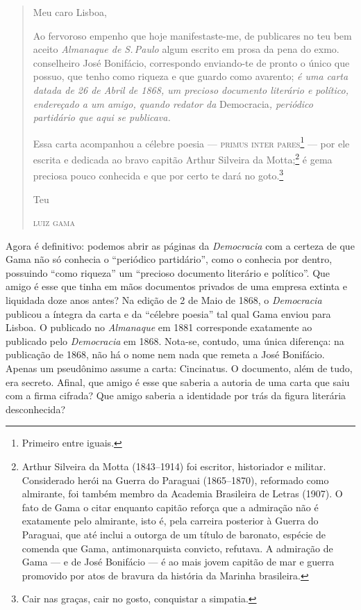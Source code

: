 \begin{quote}
Meu caro Lisboa,

Ao fervoroso empenho que hoje manifestaste-me, de publicares no teu bem
aceito \emph{Almanaque de S.\,Paulo} algum escrito em prosa da pena do
exmo. conselheiro José Bonifácio, correspondo enviando-te de pronto o
único que possuo, que tenho como riqueza e que guardo como avarento;
\textit{é uma carta datada de 26 de Abril de 1868, um precioso documento
literário e político, endereçado a um amigo, quando redator da}
Democracia\textit{, periódico partidário que aqui se publicava.}

Essa carta acompanhou a célebre poesia --- \textsc{primus inter pares}\footnote{Primeiro entre iguais.} --- por ele escrita e dedicada ao bravo capitão
Arthur Silveira da Motta;\footnote{Arthur Silveira da Motta (1843--1914)
  foi escritor, historiador e militar. Considerado herói na Guerra do
  Paraguai (1865--1870), reformado como almirante, foi também membro da
  Academia Brasileira de Letras (1907). O fato de Gama o citar enquanto
  capitão reforça que a admiração não é exatamente pelo almirante, isto
  é, pela carreira posterior à Guerra do Paraguai, que até inclui a
  outorga de um título de baronato, espécie de comenda que Gama,
  antimonarquista convicto, refutava. A admiração de Gama --- e de José
  Bonifácio --- é ao mais jovem capitão de mar e guerra promovido por
  atos de bravura da história da Marinha brasileira.} é gema preciosa
pouco conhecida e que por certo te dará no goto.\footnote{Cair nas
  graças, cair no gosto, conquistar a simpatia.}

\begin{flushright}
Teu

\textsc{luiz gama}
\end{flushright}
\end{quote}

Agora é definitivo: podemos abrir as páginas da \emph{Democracia} com a
certeza de que Gama não só conhecia o ``periódico partidário'', como o
conhecia por dentro, possuindo ``como riqueza'' um ``precioso documento
literário e político''. Que amigo é esse que tinha em mãos documentos
privados de uma empresa extinta e liquidada doze anos antes? Na edição
de 2 de Maio de 1868, o \emph{Democracia} publicou a íntegra da carta e
da ``célebre poesia'' tal qual Gama enviou para Lisboa. O publicado no
\emph{Almanaque} em 1881 corresponde exatamente ao publicado pelo
\emph{Democracia} em 1868. Nota-se, contudo, uma única diferença: na
publicação de 1868, não há o nome nem nada que remeta a José Bonifácio.
Apenas um pseudônimo assume a carta: Cincinatus. O documento,
além de tudo, era secreto. Afinal, que amigo é esse que saberia a
autoria de uma carta que saiu com a firma cifrada? Que amigo saberia a
identidade por trás da figura literária desconhecida?

